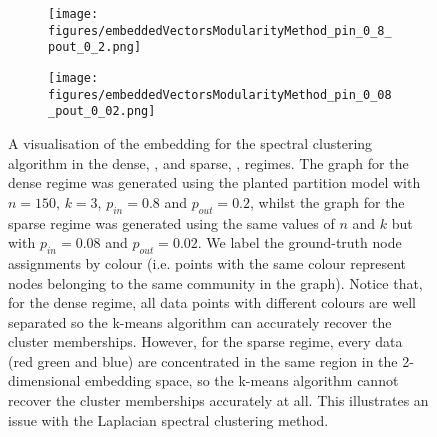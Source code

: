 \begin{figure}
	\centering
	\begin{subfigure}{.5\textwidth}
		\centering
		\texttt{[image: figures/embeddedVectorsModularityMethod\_pin\_0\_8\_pout\_0\_2.png]}
		\caption{}
		\label{fig:spectralClusteringEmbeddingVisualisationPin08}
	\end{subfigure}%
	\begin{subfigure}{.5\textwidth}
		\centering
		\texttt{[image: figures/embeddedVectorsModularityMethod\_pin\_0\_08\_pout\_0\_02.png]}
		\caption{}
		\label{fig:spectralClusteringEmbeddingVisualisationPin008}
	\end{subfigure}
	\caption[Visualisation of spectral clustering embedding in sparse and dense regimes.]{\label{fig:spectralClusteringEmbeddingVisualisationPlots} A visualisation of the embedding for the spectral clustering algorithm in the dense, , and sparse, , regimes. The graph for the dense regime was generated using the planted partition model with $n=150$, $k=3$, $p_{in}=0.8$ and $p_{out}=0.2$, whilst the graph for the sparse regime was generated using the same values of $n$ and $k$ but with $p_{in}=0.08$ and $p_{out}=0.02$. We label the ground-truth node assignments by colour (i.e. points with the same colour represent nodes belonging to the same community in the graph). Notice that, for the dense regime, all data points with different colours are well separated so the k-means algorithm can accurately recover the cluster memberships. However, for the sparse regime, every data (red green and blue) are concentrated in the same region in the 2-dimensional embedding space, so the k-means algorithm cannot recover the cluster memberships accurately at all. This illustrates an issue with the Laplacian spectral clustering method.}
\end{figure}

